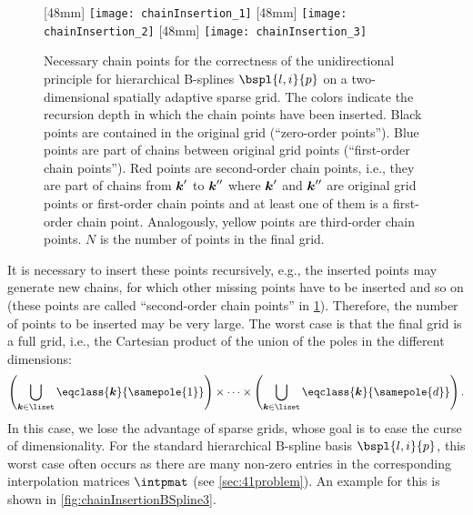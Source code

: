 \begin{figure}
  [48mm]{%
    \texttt{[image: chainInsertion\_1]}%
  }%
  \hfill%
  [48mm]{%
    \texttt{[image: chainInsertion\_2]}%
  }%
  \hfill%
  [48mm]{%
    \texttt{[image: chainInsertion\_3]}%
  }%
  \caption[%
    Chain points for hierarchical B-splines on a sparse grid%
  ]{%
    Necessary chain points for the correctness of the unidirectional principle
    for hierarchical B-splines $\bspl{l,i}{p}$ on a
    two-dimensional spatially adaptive sparse grid.
    The colors indicate the recursion depth in which the
    chain points have been inserted.
    Black points are contained in the original grid
    (``zero-order points'').
    \textcolor{C0}{Blue points} are part of chains
    between original grid points (``first-order chain points'').
    \textcolor{C1}{Red points} are second-order chain points,
    i.e., they are part of chains
    from ${\boldsymbol{k}}'$ to ${\boldsymbol{k}}''$ where ${\boldsymbol{k}}'$ and ${\boldsymbol{k}}''$ are
    original grid points or first-order chain points
    and at least one of them is a first-order chain point.
    Analogously,
    \textcolor{C2}{yellow points} are third-order chain points.
    $N$ is the number of points in the final grid.%
  }%
  \label{fig:chainInsertionBSpline}%
\end{figure}

It is necessary to insert these points recursively,
e.g., the inserted points may generate new chains,
for which other missing points have to be inserted and so on
(these points are called ``second-order chain points''
in \cref{fig:chainInsertionBSpline}).
Therefore, the number of points to be inserted may be very large.
The worst case is that the final grid is a full grid, i.e.,
the Cartesian product of the union of the poles in the different dimensions:
\begin{equation}
  \left(\bigcup_{\*k \in \liset} \eqclass{\*k}{\samepole{1}}\right)
  \times \dotsb \times
  \left(\bigcup_{\*k \in \liset} \eqclass{\*k}{\samepole{d}}\right).
\end{equation}
In this case, we lose the advantage of sparse grids,
whose goal is to ease the curse of dimensionality.
For the standard hierarchical B-spline basis $\bspl{l,i}{p}$,
this worst case often occurs as there are many non-zero entries
in the corresponding interpolation matrices $\intpmat$
(see \cref{sec:41problem}).
An example for this is shown in \cref{fig:chainInsertionBSpline3}.



